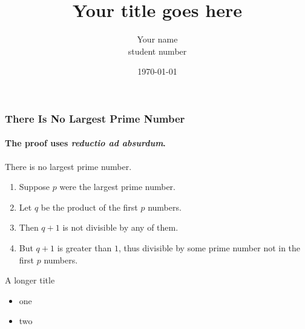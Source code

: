 \documentclass{beamer}
\title{Your title goes here}
\author{Your name \\ student number }
\date{\today}
\begin{document}
\begin{frame}
\titlepage
\end{frame}


\begin{frame} 
\frametitle{There Is No Largest Prime Number} 
\framesubtitle{The proof uses \textit{reductio ad absurdum}.} 
\begin{theorem}
There is no largest prime number. \end{theorem} 
\begin{enumerate} 
\item<1-| alert@1> Suppose $p$ were the largest prime number. 
\item<2-> Let $q$ be the product of the first $p$ numbers. 
\item<3-> Then $q+1$ is not divisible by any of them. 
\item<1-> But $q + 1$ is greater than $1$, thus divisible by some prime
number not in the first $p$ numbers.
\end{enumerate}
\end{frame}

\begin{frame}{A longer title}
\begin{itemize}
\item one
\item two
\end{itemize}
\end{frame}
\end{document}
